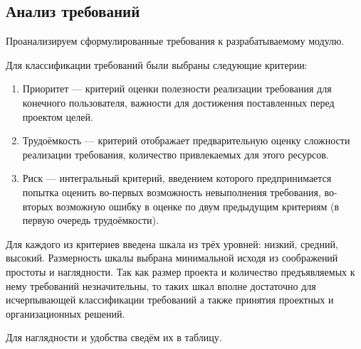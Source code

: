 \subsection{Анализ требований}
Проанализируем сформулированные требования к разрабатываемому модулю.

Для классификации требований были выбраны следующие критерии:

\begin{enumerate}
\item Приоритет --- критерий оценки полезности реализации требования для конечного пользователя,
важности для достижения поставленных перед проектом целей.
\item Трудоёмкость --- критерий отображает предварительную оценку сложности реализации требования,
количество привлекаемых для этого ресурсов.
\item Риск --- интегральный критерий, введением которого предпринимается попытка оценить во-первых
возможность невыполнения требования, во-вторых возможную ошибку в оценке по двум предыдущим
критериям (в первую очередь  трудоёмкости).
\end{enumerate}

Для каждого из критериев введена шкала из трёх уровней: низкий, средний, высокий.
Размерность шкалы выбрана минимальной исходя из соображений простоты и наглядности.
Так как размер проекта и количество предъявляемых к нему требований незначительны,
то таких шкал вполне достаточно для исчерпывающей классификации требований а также принятия
проектных и организационных решений.

Для наглядности и удобства сведём их в таблицу.

